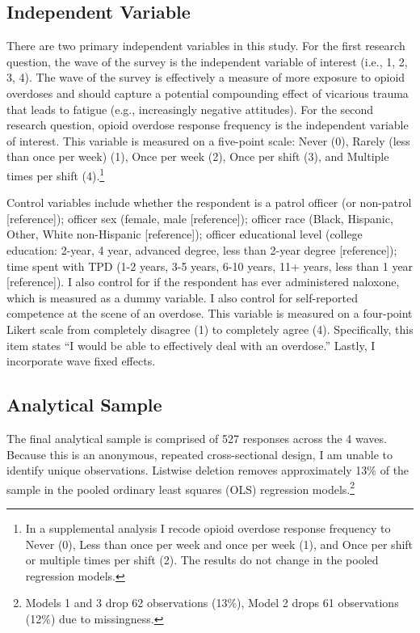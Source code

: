 \subsection{Independent Variable}

There are two primary independent variables in this study. For the first research question, the wave of the survey is the independent variable of interest (i.e., 1, 2, 3, 4). The wave of the survey is effectively a measure of more exposure to opioid overdoses and should capture a potential compounding effect of vicarious trauma that leads to fatigue (e.g., increasingly negative attitudes). For the second research question, opioid overdose response frequency is the independent variable of interest. This variable is measured on a five-point scale: Never (0), Rarely (less than once per week) (1), Once per week (2), Once per shift (3), and Multiple times per shift (4).\footnote{In a supplemental analysis I recode opioid overdose response frequency to Never (0), Less than once per week and once per week (1), and Once per shift or multiple times per shift (2). The results do not change in the pooled regression models.}

Control variables include whether the respondent is a patrol officer (or non-patrol [reference]); officer sex (female, male [reference]); officer race (Black, Hispanic, Other, White non-Hispanic [reference]); officer educational level (college education: 2-year, 4 year, advanced degree, less than 2-year degree [reference]); time spent with TPD (1-2 years, 3-5 years, 6-10 years, 11+ years, less than 1 year [reference]). I also control for if the respondent has ever administered naloxone, which is measured as a dummy variable. I also control for self-reported competence at the scene of an overdose. This variable is measured on a four-point Likert scale from completely disagree (1) to completely agree (4). Specifically, this item states “I would be able to effectively deal with an overdose.”  Lastly, I incorporate wave fixed effects.

\subsection{Analytical Sample}

The final analytical sample is comprised of 527 responses across the 4 waves. Because this is an anonymous, repeated cross-sectional design, I am unable to identify unique observations. Listwise deletion removes approximately 13\% of the sample in the pooled ordinary least squares (OLS) regression models.\footnote{Models 1 and 3 drop 62 observations (13\%), Model 2 drops 61 observations (12\%) due to missingness.} 

